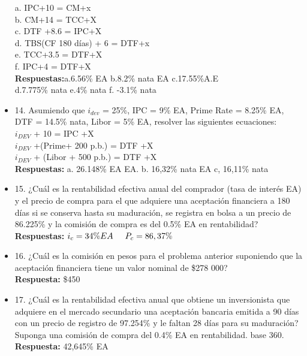 \begin{itemize}
	a. IPC+10 = CM+x\\
	b. CM+14 = TCC+X\\
	c. DTF +8.6 = IPC+X\\
	d. TBS(CF 180 días) + 6 = DTF+x\\
	e. TCC+3.5 = DTF+X\\
	f. IPC+4 = DTF+X\\
	\textbf{Respuestas:}a.6.56\% EA\hspace{0,5cm} b.8.2\% nata EA\hspace{0,5cm} c.17.55\%A.E
	\\d.7.775\% nata\hspace{0,5cm} e.4\% nata\hspace{0,5cm} f. -3.1\% nata\\
	\medskip
	\item 14. Asumiendo que $i_{dev}$  = 25\%, IPC = 9\% EA, Prime Rate = 8.25\% EA, DTF = 14.5\% nata, Libor = 5\% EA, resolver las siguientes ecuaciones:\\
	
	$i_{DEV}$  + 10 = IPC +X\\
	$i_{DEV}$  +(Prime+ 200 p.b.) = DTF +X\\
	$i_{DEV}$  + (Libor + 500 p.b.) = DTF +X\\
	\textbf{Respuestas:} a. 26.148\% EA\hspace{0,5cm} EA. b. 16,32\% nata EA\hspace{0,5cm} c, 16,11\% nata\\
	\medskip
	\item 15. ¿Cuál es la rentabilidad efectiva anual del comprador (tasa de interés EA) y el precio de compra para el que adquiere una aceptación financiera a 180 días si se conserva hasta su maduración, se registra en bolsa a un precio de 86.225\% y la comisión de compra es del 0.5\% EA en rentabilidad?\\
	\textbf{Respuestas:} $i_{c} = 34\% EA\hspace{0,5cm}  P_{c} = 86,37\%$\\
	\medskip
	\item 16. ¿Cuál es la comisión en pesos para el problema anterior suponiendo que la aceptación financiera tiene un valor nominal de \$278 000?\\
	\textbf{Respuesta:} \$450\\
	\medskip
	\item 17. ¿Cuál es la rentabilidad efectiva anual que obtiene un inversionista que adquiere en el mercado secundario una aceptación bancaria emitida a 90 días con un precio de registro de 97.254\% y le faltan 28 días para su maduración? Suponga una comisión de compra del 0.4\% EA en rentabilidad. base 360.\\
	\textbf{Respuesta:} 42,645\% EA\\
	\medskip
	

\end{itemize}
